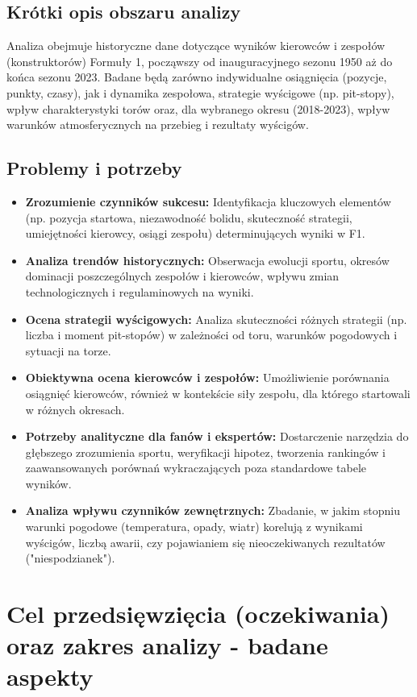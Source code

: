 \documentclass[a4paper,12pt]{article}
\begin{document}
\subsection{Krótki opis obszaru analizy}
Analiza obejmuje historyczne dane dotyczące wyników kierowców i zespołów (konstruktorów) Formuły 1, począwszy od inauguracyjnego sezonu 1950 aż do końca sezonu 2023. Badane będą zarówno indywidualne osiągnięcia (pozycje, punkty, czasy), jak i dynamika zespołowa, strategie wyścigowe (np. pit-stopy), wpływ charakterystyki torów oraz, dla wybranego okresu (2018-2023), wpływ warunków atmosferycznych na przebieg i rezultaty wyścigów.

\subsection{Problemy i potrzeby}
\begin{itemize}[label=\textbullet, leftmargin=*]
  \item \textbf{Zrozumienie czynników sukcesu:} Identyfikacja kluczowych elementów (np. pozycja startowa, niezawodność bolidu, skuteczność strategii, umiejętności kierowcy, osiągi zespołu) determinujących wyniki w F1.
  \item \textbf{Analiza trendów historycznych:} Obserwacja ewolucji sportu, okresów dominacji poszczególnych zespołów i kierowców, wpływu zmian technologicznych i regulaminowych na wyniki.
  \item \textbf{Ocena strategii wyścigowych:} Analiza skuteczności różnych strategii (np. liczba i moment pit-stopów) w zależności od toru, warunków pogodowych i sytuacji na torze.
  \item \textbf{Obiektywna ocena kierowców i zespołów:} Umożliwienie porównania osiągnięć kierowców, również w kontekście siły zespołu, dla którego startowali w różnych okresach.
  \item \textbf{Potrzeby analityczne dla fanów i ekspertów:} Dostarczenie narzędzia do głębszego zrozumienia sportu, weryfikacji hipotez, tworzenia rankingów i zaawansowanych porównań wykraczających poza standardowe tabele wyników.
  \item \textbf{Analiza wpływu czynników zewnętrznych:} Zbadanie, w jakim stopniu warunki pogodowe (temperatura, opady, wiatr) korelują z wynikami wyścigów, liczbą awarii, czy pojawianiem się nieoczekiwanych rezultatów ("niespodzianek").
\end{itemize}

\section{Cel przedsięwzięcia (oczekiwania) oraz zakres analizy - badane aspekty}
\end{document}

